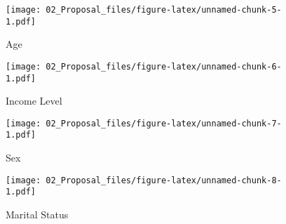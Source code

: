 \documentclass[11pt,]{article}
\begin{document}
\begin{figure}[htbp]
\centering
\texttt{[image: 02\_Proposal\_files/figure-latex/unnamed-chunk-5-1.pdf]}
\caption{Age}
\end{figure}

\begin{figure}[htbp]
\centering
\texttt{[image: 02\_Proposal\_files/figure-latex/unnamed-chunk-6-1.pdf]}
\caption{Income Level}
\end{figure}

\begin{figure}[htbp]
\centering
\texttt{[image: 02\_Proposal\_files/figure-latex/unnamed-chunk-7-1.pdf]}
\caption{Sex}
\end{figure}

\begin{figure}[htbp]
\centering
\texttt{[image: 02\_Proposal\_files/figure-latex/unnamed-chunk-8-1.pdf]}
\caption{Marital Status}
\end{figure}
\end{document}
